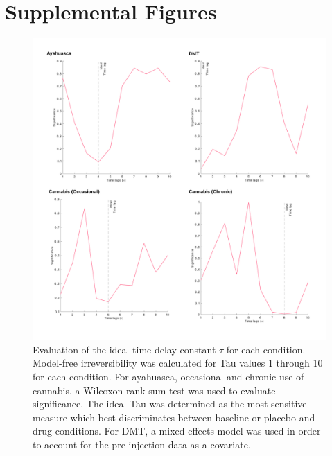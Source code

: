 \chapter{Supplemental Figures}

\begin{figure}[h]
    \centering
    \includegraphics[width=\textwidth]{images/Appendix_ Tau Calculation.png}
    \caption{Evaluation of the ideal time-delay constant $\tau$ for each condition. Model-free irreversibility was calculated for Tau values 1 through 10 for each condition. For ayahuasca, occasional and chronic use of cannabis, a Wilcoxon rank-sum test was used to evaluate significance. The ideal Tau was determined as the most sensitive measure which best discriminates between baseline or placebo and drug conditions. For DMT, a mixed effects model was used in order to account for the pre-injection data as a covariate.}
    \label{fig:tau}
\end{figure}

